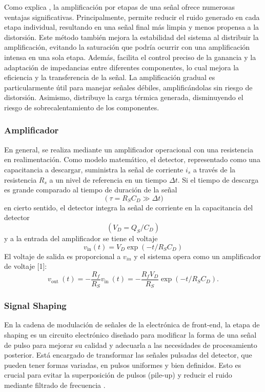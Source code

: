 \documentclass[]{book}
\begin{document}
\noindent Como explica \cite{proakis2007digital}, la amplificación por etapas de una señal ofrece numerosas ventajas significativas. Principalmente, permite reducir el ruido generado en cada etapa individual, resultando en una señal final más limpia y menos propensa a la distorsión. Este método también mejora la estabilidad del sistema al distribuir la amplificación, evitando la saturación que podría ocurrir con una amplificación intensa en una sola etapa. Además, facilita el control preciso de la ganancia y la adaptación de impedancias entre diferentes componentes, lo cual mejora la eficiencia y la transferencia de la señal. La amplificación gradual es particularmente útil para manejar señales débiles, amplificándolas sin riesgo de distorsión. Asimismo, distribuye la carga térmica generada, disminuyendo el riesgo de sobrecalentamiento de los componentes. \\

\subsubsection{Amplificador}

\noindent En general, se realiza mediante un amplificador operacional con una resistencia en realimentación. Como modelo matemático, el detector, representado como una capacitancia a descargar, suministra la señal de corriente $i_{s}$ a través de la resistencia $R_{s}$ a un nivel de referencia en un tiempo $\Delta t$. Si el tiempo de descarga es grande comparado al tiempo de duración de la señal $$\left(\tau=R_S C_D \gg\right. \Delta t)$$ en cierto sentido, el detector integra la señal de corriente en la capacitancia del detector $$\left(V_D=Q_S / C_D\right)$$ y a la entrada del amplificador se tiene el voltaje $$v_{\text{in}}(t)=V_D \exp \left(-t / R_S C_D\right)$$ El voltaje de salida es proporcional a $v_{i n}$ y el sistema opera como un amplificador de voltaje [1]:
$$
v_{\text {out }}(t)=-\frac{R_f}{R_S} v_{\text {in }}(t)=-\frac{R_f V_D}{R_S} \exp \left(-t / R_S C_D\right) .
$$

\subsubsection{Signal Shaping}

\noindent En la cadena de modulación de señales de la electrónica de front-end, la etapa de shaping es un circuito electrónico diseñado para modificar la forma de una señal de pulso para mejorar su calidad y adecuarla a las necesidades de procesamiento posterior. Está encargado de transformar las señales pulsadas del detector, que pueden tener formas variadas, en pulsos uniformes y bien definidos. Esto es crucial para evitar la superposición de pulsos (pile-up) y reducir el ruido mediante filtrado de frecuencia \cite{leo1994techniques}.\\
\end{document}
